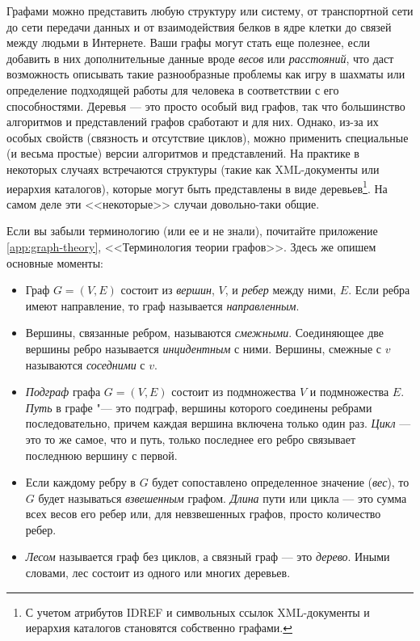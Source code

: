 Графами можно представить любую структуру или систему, от транспортной сети до сети передачи данных и от взаимодействия белков в ядре клетки до связей между людьми в Интернете.
Ваши графы могут стать еще полезнее, если добавить в них дополнительные данные вроде \textit{весов} или \textit{расстояний}, что даст возможность описывать такие разнообразные проблемы как игру в шахматы или определение подходящей работы для человека в соответствии с его способностями.
Деревья — это просто особый вид графов, так что большинство алгоритмов и представлений графов сработают и для них.
Однако, из-за их особых свойств (связность и отсутствие циклов), можно применить специальные (и весьма простые) версии алгоритмов и представлений.
На практике в некоторых случаях встречаются структуры (такие как XML-документы или иерархия каталогов), которые могут быть представлены в виде деревьев\footnote{С учетом атрибутов IDREF и символьных ссылок XML-документы и иерархия каталогов становятся собственно графами.}. На самом деле эти <<некоторые>> случаи довольно-таки общие.

Если вы забыли терминологию (или ее и не знали), почитайте приложение \ref{app:graph-theory}, <<Терминология теории графов>>. Здесь же опишем основные моменты:

\begin{itemize}
\item Граф $G = (V, E)$ состоит из \textit{вершин}, $V$, и \textit{ребер} между ними, $E$. Если ребра имеют направление, то граф называется \textit{направленным}.
\item Вершины, связанные ребром, называются \textit{смежными}. Соединяющее две вершины ребро называется \textit{инцидентным} с ними. Вершины, смежные с $v$ называются \textit{соседними} с $v$.
\item \textit{Подграф} графа $G = (V,E)$ состоит из подмножества $V$ и подмножества $E$. \textit{Путь} в графе "--- это подграф, вершины которого соединены ребрами последовательно, причем каждая вершина включена только один раз. \textit{Цикл} — это то же самое, что и путь, только последнее его ребро связывает последнюю вершину с первой.
\item Если каждому ребру в $G$ будет сопоставлено определенное значение (\textit{вес}), то $G$ будет называться \textit{взвешенным} графом. \textit{Длина} пути или цикла — это сумма всех весов его ребер или, для невзвешенных графов, просто количество ребер.
\item \textit{Лесом} называется граф без циклов, а связный граф — это \textit{дерево}. Иными словами, лес состоит из одного или многих деревьев.
\end{itemize}

